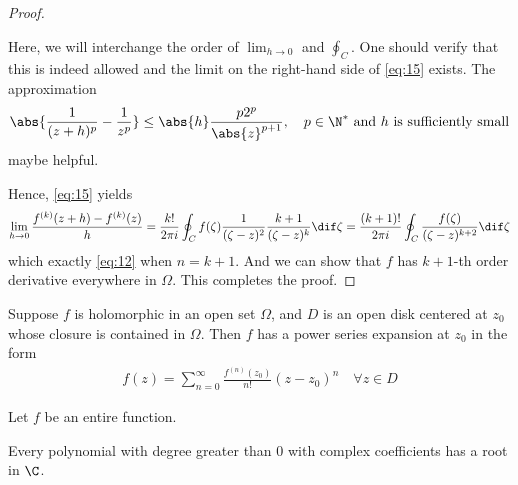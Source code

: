 \documentclass[thmcnt=section, color=cyan, 12pt]{my-elegantbook}
\begin{document}
\begin{proof}
	\begin{note}
		Here, we will interchange the order of $\lim_{h \to 0}$ and $\oint_C$.
		One should verify that this is indeed allowed and
		the limit on the right-hand side of \eqref{eq:15} exists.
		The approximation
		\begin{align*}
			\abs{\frac{1}{(z+h)^p} - \frac{1}{z^p}}
			\leq \abs{h} \frac{p 2^p}{\abs{z}^{p+1}},
			\quad p \in \N^\ast \text{ and $h$ is sufficiently small}
		\end{align*}
		maybe helpful.
	\end{note}

	Hence, \eqref{eq:15} yields
	\begin{align*}
		\lim_{h \to 0} \frac{f^{(k)}(z+h) - f^{(k)}(z)}{h}
		= \frac{k!}{2 \pi i} \oint_C f(\zeta)
		\frac{1}{(\zeta - z)^2} \frac{k+1}{(\zeta - z)^{k}}
		\dif \zeta
		= \frac{(k+1)!}{2 \pi i} \oint_C
		\frac{f(\zeta)}{(\zeta - z)^{k+2}}
		\dif \zeta
	\end{align*}
	which exactly \eqref{eq:12} when $n=k+1$.
	And we can show that $f$ has $k+1$-th order derivative everywhere in $\Omega$.
	This completes the proof.
\end{proof}


\begin{theorem} \label{thm:1}
	Suppose $f$ is holomorphic in an open set $\Omega$, and $D$ is an open disk
	centered at $z_0$ whose closure is contained in $\Omega$. Then $f$ has a power
	series expansion at $z_0$ in the form
	\begin{align}
		f(z) = \sum_{n=0}^\infty \frac{f^{(n)}(z_0)}{n!}  (z - z_0)^n \quad \forall z \in D
		\label{eq:1}
	\end{align}
\end{theorem}


\begin{theorem} \label{thm:2}
	Let $f$ be an entire function.
\end{theorem}

\begin{theorem} \label{thm:3}
	Every polynomial with degree greater than $0$ with complex coefficients has a
	root in $\C$.
\end{theorem}
\end{document}
